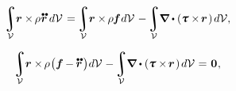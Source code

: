 \begin{otherlanguage}{russian}
\nopagebreak\vspace{-0.2em}\begin{equation*}
\integral\displaylimits_{\mathcal{V}} \hspace{-0.5ex} \currentlocationvector \times \hspace{-0.2ex} \rho \hspace{.1ex} \mathdotdotabove{\currentlocationvector} \hspace{.4ex} d\mathcal{V} \hspace{.22ex}
= \hspace{-0.2ex} \integral\displaylimits_{\mathcal{V}} \hspace{-0.5ex} \currentlocationvector \times \hspace{-0.2ex} \rho \hspace{-0.1ex} \massloadvector \hspace{0.1ex} d\mathcal{V} \hspace{.2ex}
- \hspace{-0.2ex} \integral\displaylimits_{\mathcal{V}} \hspace{-0.5ex} \boldnabla \dotp \left( \cauchystress \times \hspace{-0.24ex} \currentlocationvector \hspace{.2ex} \right) \hspace{-0.1ex} d\mathcal{V} ,
\end{equation*}

\nopagebreak\vspace{-0.2em}\begin{equation*}
\integral\displaylimits_{\mathcal{V}} \hspace{-0.5ex} \currentlocationvector \times \hspace{-0.2ex} \rho \hspace{.15ex} \bigl( \massloadvector \hspace{-0.1ex} - \hspace{-0.1ex} \mathdotdotabove{\currentlocationvector} \hspace{.2ex} \bigr) \hspace{.1ex} d\mathcal{V} \hspace{.12ex}
- \hspace{-0.2ex} \integral\displaylimits_{\mathcal{V}} \hspace{-0.5ex} \boldnabla \dotp \left( \cauchystress \times \hspace{-0.24ex} \currentlocationvector \hspace{.2ex} \right) \hspace{-0.1ex} d\mathcal{V} \hspace{.1ex}
= \hspace{.15ex} \zerovector
\hspace{.1ex} ,
\end{equation*}


\end{otherlanguage}
